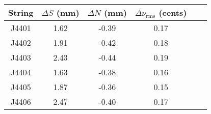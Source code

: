 \begin{tabular}{cccccc}
\toprule
String & $\Delta S$ (mm) & $\Delta N$ (mm) & $\overline{\Delta \nu}_\text{rms}$ (cents) \\
\midrule
J4401 & 1.62 & -0.39 & 0.17 \\
J4402 & 1.91 & -0.42 & 0.18 \\
J4403 & 2.43 & -0.44 & 0.19 \\
J4404 & 1.63 & -0.38 & 0.16 \\
J4405 & 1.87 & -0.36 & 0.15 \\
J4406 & 2.47 & -0.40 & 0.17 \\
\bottomrule
\end{tabular}

